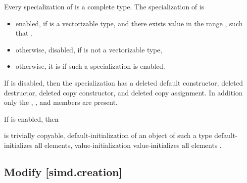 \begin{wgText}\setcounter{Paras}{0}
\pnum
Every specialization of  is a complete type.
The specialization of  is
\begin{itemize}
 \item
    enabled, if  is a vectorizable type, and there exists value
     in the range , such that   ,
 \item
   otherwise, disabled, if  is not a vectorizable type,
 \item
   otherwise, it is  if such a specialization is enabled.
\end{itemize}

If  is disabled, then the specialization has a
deleted default constructor, deleted destructor, deleted copy constructor, and
deleted copy assignment.
In addition only the , , and
 members are present.

If  is enabled, then
\begin{itemize}
  \wgItemAdd {} is trivially copyable,
  \wgItemAdd default-initialization of an object of such a type default-initializes all elements,
  \wgItemAdd value-initialization value-initializes all elements\wgAdd{,}
  .
\end{itemize}

\end{wgText}

\subsection{Modify [simd.creation]}

